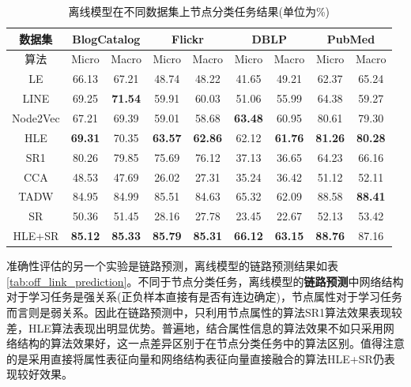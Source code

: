 \begin{table}[]
	\centering
	\caption{离线模型在不同数据集上节点分类任务结果(单位为\%)}
	\label{tab:static_node_classification}
	\begin{tabular}{|c||c|c||c|c||c|c||c|c|}
		\hline
		数据集      & \multicolumn{2}{c||}{BlogCatalog} & \multicolumn{2}{c||}{Flickr}     & \multicolumn{2}{c||}{DBLP}   & \multicolumn{2}{c|}{PubMed}     \\ \hline\hline
		算法       & Micro        & Macro       & Micro       & Macro       & Micro       & Macro       & Micro       & Macro       \\ \hline
		LE       & 66.13           & 67.21          & 48.74          & 48.22          & 41.65          & 49.21          & 62.37          & 65.24          \\ \hline
		LINE     & 69.25           & \textbf{71.54} & 59.91          & 60.03          & 51.06          & 55.99          & 64.38          & 59.27          \\ \hline
		Node2Vec & 67.21           & 69.39          & 59.01          & 58.68          & \textbf{63.48}          & 60.95 & 80.61          & 79.30          \\ \hline
		HLE      & \textbf{69.31}  & 70.35          & \textbf{63.57} & \textbf{62.86} & 62.12 & \textbf{61.76}          & \textbf{81.26} & \textbf{80.28} \\ \hline\hline
		SR1      & 80.26           & 79.85          & 75.69          & 76.12          & 37.13          & 36.65          & 64.23          & 66.16          \\ \hline\hline
		CCA      & 48.53           & 47.69          & 26.02          & 27.31          & 35.24          & 36.42          & 51.12          & 52.11          \\ \hline
		TADW     & 84.95           & 84.99          & 85.51          & 84.63 & 65.32          & 62.09          & 88.58          & \textbf{88.41} \\ \hline
		SR       & 50.36           & 51.45          & 28.16          & 27.78          & 23.45          & 22.67          & 52.13          & 53.42          \\ \hline
		HLE+SR   & \textbf{85.12}  & \textbf{85.33} & \textbf{85.79} & \textbf{85.31}          & \textbf{66.12} & \textbf{63.15} & \textbf{88.76} & 87.16          \\ \hline
	\end{tabular}
\end{table}

准确性评估的另一个实验是链路预测，离线模型的链路预测结果如表\ref{tab:off_link_prediction}。不同于节点分类任务，离线模型的\textbf{链路预测}中网络结构对于学习任务是强关系(正负样本直接有是否有连边确定)，节点属性对于学习任务而言则是弱关系。因此在链路预测中，只利用节点属性的算法SR1算法效果表现较差，HLE算法表现出明显优势。普遍地，结合属性信息的算法效果不如只采用网络结构的算法效果好，这一点差异区别于在节点分类任务中的算法区别。值得注意的是采用直接将属性表征向量和网络结构表征向量直接融合的算法HLE+SR仍表现较好效果。

